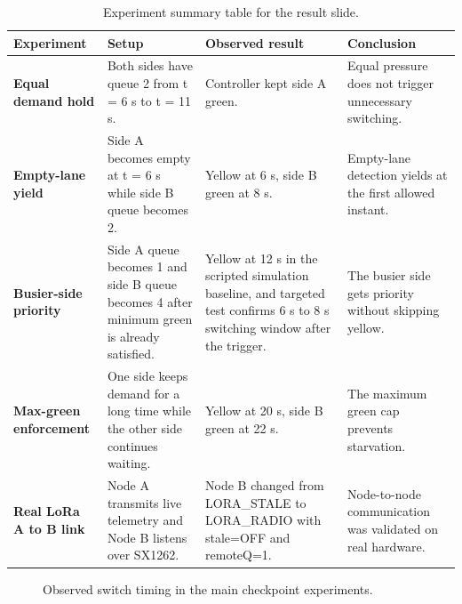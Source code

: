 \documentclass[11pt,a4paper]{article}
\begin{document}
\begin{table}[h!]
\centering
\small
\begin{tabularx}{\textwidth}{>{\bfseries}p{} Y Y Y}
\toprule
Experiment & Setup & Observed result & Conclusion \\
\midrule
Equal demand hold & Both sides have queue 2 from t = 6 s to t = 11 s. & Controller kept side A green. & Equal pressure does not trigger unnecessary switching. \\
Empty-lane yield & Side A becomes empty at t = 6 s while side B queue becomes 2. & Yellow at 6 s, side B green at 8 s. & Empty-lane detection yields at the first allowed instant. \\
Busier-side priority & Side A queue becomes 1 and side B queue becomes 4 after minimum green is already satisfied. & Yellow at 12 s in the scripted simulation baseline, and targeted test confirms 6 s to 8 s switching window after the trigger. & The busier side gets priority without skipping yellow. \\
Max-green enforcement & One side keeps demand for a long time while the other side continues waiting. & Yellow at 20 s, side B green at 22 s. & The maximum green cap prevents starvation. \\
Real LoRa A to B link & Node A transmits live telemetry and Node B listens over SX1262. & Node B changed from LORA\_STALE to LORA\_RADIO with stale=OFF and remoteQ=1. & Node-to-node communication was validated on real hardware. \\
\bottomrule
\end{tabularx}
\caption{Experiment summary table for the result slide.}
\end{table}

\begin{figure}[h!]
\centering
{}
\caption{Observed switch timing in the main checkpoint experiments.}
\end{figure}
\end{document}
